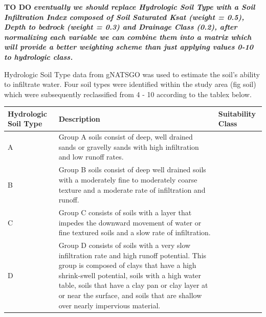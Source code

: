 \documentclass[
  number,
  preprint,
  3p,
  onecolumn]{elsarticle}
\begin{document}
\textbf{TO DO} \textbf{\emph{eventually we should replace Hydrologic
Soil Type with a Soil Infiltration Index composed of Soil Saturated Ksat
(weight = 0.5), Depth to bedrock (weight = 0.3) and Drainage Class
(0.2), after normalizing each variable we can combine them into a matrix
which will provide a better weighting scheme than just applying values
0-10 to hydrologic class.}}

Hydrologic Soil Type data from gNATSGO was used to estimate the soil's
ability to infiltrate water. Four soil types were identified within the
study area (fig soil) which were subsequently reclassified from 4 - 10
according to the tablex below.

\begin{longtable}[]{@{}
  >{\raggedright\arraybackslash}p{}
  >{\raggedright\arraybackslash}p{}
  >{\raggedright\arraybackslash}p{}@{}}
\toprule\noalign{}
\begin{minipage}[b]{\linewidth}\raggedright
Hydrologic Soil Type
\end{minipage} & \begin{minipage}[b]{\linewidth}\raggedright
Description
\end{minipage} & \begin{minipage}[b]{\linewidth}\raggedright
Suitability Class
\end{minipage} \\
\midrule\noalign{}
\endhead
\bottomrule\noalign{}
\endlastfoot
A & Group A soils consist of deep, well drained sands or gravelly sands
with high infiltration and low runoff rates. & 10 \\
B & Group B soils consist of deep well drained soils with a moderately
fine to moderately coarse texture and a moderate rate of infiltration
and runoff. & 8 \\
C & Group C consists of soils with a layer that impedes the downward
movement of water or fine textured soils and a slow rate of
infiltration. & 6 \\
D & Group D consists of soils with a very slow infiltration rate and
high runoff potential. This group is composed of clays that have a high
shrink-swell potential, soils with a high water table, soils that have a
clay pan or clay layer at or near the surface, and soils that are
shallow over nearly impervious material. & 4 \\
\end{longtable}
\end{document}
